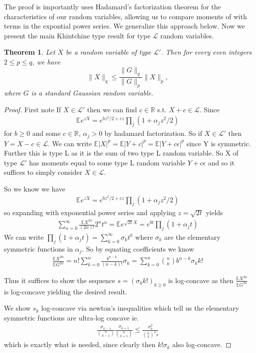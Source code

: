 \documentclass[10pt]{article}
\newcommand{\E}{\mathbb{E}}
\newcommand{\1}{\textbf{1}}
\newcommand{\R}{\mathbb{R}}
\newtheorem{theorem}{Theorem}
\theoremstyle{remark}
\theoremstyle{definition}
\begin{document}
The proof is importantly uses Hadamard's factorization theorem for the characteristics of our random variables, allowing us to compare moments of with terms in the expontial power series. We generalize this approach below. Now we present the main Khintchine type result for type $\mathcal{L}$ random variables. 

\begin{theorem}
Let $X$ be a random variable of type $\mathcal{L}'$. Then for every even integers $2 \leq p \leq q$, we have
\begin{equation*}\label{eq:mom-comp}
\|X\|_q \leq \frac{\|G\|_q}{\|G\|_p}\|X\|_p,
\end{equation*}
where $G$ is a standard Gaussian random variable.
\end{theorem}

\begin{proof}
	First note If $X \in \mathcal{L}'$ then we can find $c \in \R$ s.t. $X+c \in \mathcal{L}$. Since
	\begin{align*}
		\E e^{zX} = e^{bz^2/2+cz}\prod_j(1+\alpha_jz^2/2)
	\end{align*}
	for $b \geq 0$ and some $c \in \R$, $\alpha_j > 0$ by hadamard factorization. So if $X \in \mathcal{L}'$ then $Y = X-c \in \mathcal{L}$. We can write $\E|X|^p = \E|Y+c|^p = \E|Y+c\epsilon|^p$ since Y is symmetric. Further this is type L as it is the sum of two type L random variable. So X of type $\mathcal{L}'$ has moments equal to some type L random variable $Y+c\epsilon$ and so it suffices to simply consider $X \in \mathcal{L}$.

	So we know we have
	\begin{align*}
		\E e^{zX} = e^{bz^2/2+cz}\prod_j(1+\alpha_jz^2/2)
	\end{align*}
	so expanding with exponential power series and applying $z = \sqrt{2t}$ yields
	\begin{align*}
		\sum_{n=0}^{\infty}\frac{\E X^{2n}}{(2n)!} 2^nt^n = \E e^{\sqrt{2t}X} = e^{bt}\prod_j(1+\alpha_j t)
	\end{align*}
	We can write $\prod_j(1+\alpha_j t) = \sum_{k=0}^{\infty}\sigma_k t^k$ where $\sigma_k$ are the elementary symmetric functions in $\alpha_j$. So by equating coefficients we know 
	\begin{align*}
		\frac{\E X^{2n}}{\E G^{2n}} = n!\sum_{k=0}^n \frac{b^{n-k}}{(n-k)!}\sigma_k = \sum_{k=0}^n {n \choose k}b^{n-k}\sigma_k k!
	\end{align*}

	Thus it suffices to show the sequence $s = (\sigma_k k!)_{k \geq 0}$ is log-concave as then $\frac{\E X^{2n}}{\E G^{2n}}$ is log-concave yielding the desired result. 

	We show $s_k$ log-concave via newton's inequalities which tell us the elementary symmetric functions are ultra-log concave ie.
	\begin{align*}
		\frac{\sigma_{k-1}}{{n \choose k-1}}\frac{\sigma_{k+1}}{{n \choose k+1}} \leq \frac{\sigma_{k}^2}{{n \choose k}^2s}
	\end{align*}
	which is exactly what is needed, since clearly then $k!\sigma_k$ also log-concave.
\end{proof}
\end{document}
